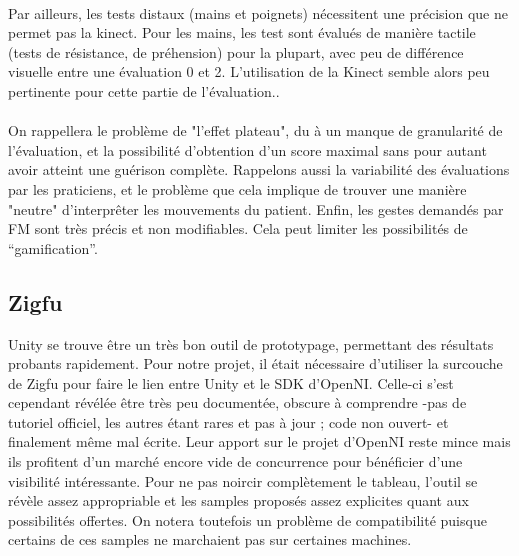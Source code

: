 \documentclass[french,12pt]{report}
\begin{document}
\paragraph{}
Par ailleurs, les tests distaux (mains et poignets) nécessitent une précision que ne permet pas la kinect.
Pour les mains, les test sont évalués de manière tactile (tests de résistance, de préhension) pour la plupart, 
avec peu de différence visuelle entre une évaluation 0 et 2. L’utilisation de la Kinect semble alors 
peu pertinente pour cette partie de l’évaluation..

\paragraph{}
On rappellera le problème de "l'effet plateau", du à un manque de granularité de l'évaluation, et la possibilité
d'obtention d'un score maximal sans pour autant avoir atteint une guérison complète. Rappelons aussi la variabilité
des évaluations par les praticiens, et le problème que cela implique de trouver une manière "neutre" d'interprêter
les mouvements du patient.
Enfin, les gestes demandés par FM sont très précis et non modifiables. Cela peut limiter les possibilités de “gamification”.
		
			\subsection{Zigfu}
Unity se trouve être un très bon outil de prototypage, permettant des résultats probants rapidement. Pour notre projet, il était nécessaire d'utiliser la surcouche de Zigfu pour faire le lien entre Unity et le SDK d'OpenNI. Celle-ci s'est cependant révélée être très peu documentée, obscure à comprendre -pas de tutoriel officiel, les autres étant rares et pas à jour ; code non ouvert- et finalement même mal écrite. Leur apport sur le projet d'OpenNI reste mince mais ils profitent d'un marché encore vide de concurrence pour bénéficier d'une visibilité intéressante. Pour ne pas noircir complètement le tableau, l'outil se révèle assez appropriable et les samples proposés assez explicites quant aux possibilités offertes. On notera toutefois un problème de compatibilité puisque certains de ces samples ne marchaient pas sur certaines machines.
		
\end{document}
